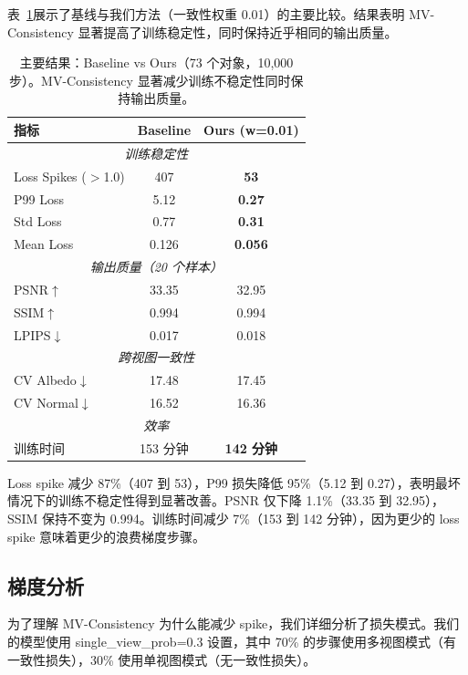 \documentclass{article}
\begin{document}
表~\ref{tab:main}展示了基线与我们方法（一致性权重 0.01）的主要比较。结果表明 MV-Consistency 显著提高了训练稳定性，同时保持近乎相同的输出质量。

\begin{table}[h]
\centering
\caption{主要结果：Baseline vs Ours（73 个对象，10,000 步）。MV-Consistency 显著减少训练不稳定性同时保持输出质量。}
\label{tab:main}
\begin{tabular}{lcc}
\toprule
指标 & Baseline & Ours (w=0.01) \\
\midrule
\multicolumn{3}{c}{\textit{训练稳定性}} \\
Loss Spikes ($>$1.0) & 407 & \textbf{53} \\
P99 Loss & 5.12 & \textbf{0.27} \\
Std Loss & 0.77 & \textbf{0.31} \\
Mean Loss & 0.126 & \textbf{0.056} \\
\midrule
\multicolumn{3}{c}{\textit{输出质量（20 个样本）}} \\
PSNR$\uparrow$ & 33.35 & 32.95 \\
SSIM$\uparrow$ & 0.994 & 0.994 \\
LPIPS$\downarrow$ & 0.017 & 0.018 \\
\midrule
\multicolumn{3}{c}{\textit{跨视图一致性}} \\
CV Albedo$\downarrow$ & 17.48 & 17.45 \\
CV Normal$\downarrow$ & 16.52 & 16.36 \\
\midrule
\multicolumn{3}{c}{\textit{效率}} \\
训练时间 & 153 分钟 & \textbf{142 分钟} \\
\bottomrule
\end{tabular}
\end{table}

Loss spike 减少 87\%（407 到 53），P99 损失降低 95\%（5.12 到 0.27），表明最坏情况下的训练不稳定性得到显著改善。PSNR 仅下降 1.1\%（33.35 到 32.95），SSIM 保持不变为 0.994。训练时间减少 7\%（153 到 142 分钟），因为更少的 loss spike 意味着更少的浪费梯度步骤。

\subsection{梯度分析}
\label{sec:gradient}

为了理解 MV-Consistency 为什么能减少 spike，我们详细分析了损失模式。我们的模型使用 single\_view\_prob=0.3 设置，其中 70\% 的步骤使用多视图模式（有一致性损失），30\% 使用单视图模式（无一致性损失）。
\end{document}

